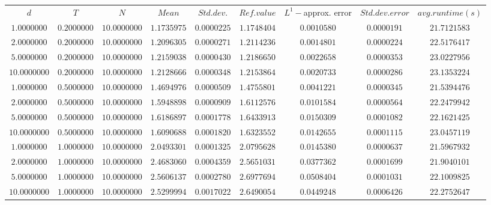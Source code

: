 \begin{tabular}{ccccccccc}
$d$ & $T$ & $N$ & $Mean$ & $Std. dev.$ & $Ref. value$ & $L^1-$approx. error & $Std. dev. error$ & $avg. runtime (s)$\\
$1.0000000$ & $0.2000000$ & $10.0000000$ & $1.1735975$ & $0.0000225$ & $1.1748404$ & $0.0010580$ & $0.0000191$ & $21.7121583$\\
$2.0000000$ & $0.2000000$ & $10.0000000$ & $1.2096305$ & $0.0000271$ & $1.2114236$ & $0.0014801$ & $0.0000224$ & $22.5176417$\\
$5.0000000$ & $0.2000000$ & $10.0000000$ & $1.2159038$ & $0.0000430$ & $1.2186650$ & $0.0022658$ & $0.0000353$ & $23.0227956$\\
$10.0000000$ & $0.2000000$ & $10.0000000$ & $1.2128666$ & $0.0000348$ & $1.2153864$ & $0.0020733$ & $0.0000286$ & $23.1353224$\\
$1.0000000$ & $0.5000000$ & $10.0000000$ & $1.4694976$ & $0.0000509$ & $1.4755801$ & $0.0041221$ & $0.0000345$ & $21.5394476$\\
$2.0000000$ & $0.5000000$ & $10.0000000$ & $1.5948898$ & $0.0000909$ & $1.6112576$ & $0.0101584$ & $0.0000564$ & $22.2479942$\\
$5.0000000$ & $0.5000000$ & $10.0000000$ & $1.6186897$ & $0.0001778$ & $1.6433913$ & $0.0150309$ & $0.0001082$ & $22.1621425$\\
$10.0000000$ & $0.5000000$ & $10.0000000$ & $1.6090688$ & $0.0001820$ & $1.6323552$ & $0.0142655$ & $0.0001115$ & $23.0457119$\\
$1.0000000$ & $1.0000000$ & $10.0000000$ & $2.0493301$ & $0.0001325$ & $2.0795628$ & $0.0145380$ & $0.0000637$ & $21.5967932$\\
$2.0000000$ & $1.0000000$ & $10.0000000$ & $2.4683060$ & $0.0004359$ & $2.5651031$ & $0.0377362$ & $0.0001699$ & $21.9040101$\\
$5.0000000$ & $1.0000000$ & $10.0000000$ & $2.5606137$ & $0.0002780$ & $2.6977694$ & $0.0508404$ & $0.0001031$ & $22.1009825$\\
$10.0000000$ & $1.0000000$ & $10.0000000$ & $2.5299994$ & $0.0017022$ & $2.6490054$ & $0.0449248$ & $0.0006426$ & $22.2752647$\\
\end{tabular}
